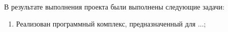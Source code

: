 \Outtro
В результате выполнения проекта были выполнены следующие задачи:
\begin{enumerate}
\item Реализован программный комплекс, предназначенный для ...;
\end{enumerate}

